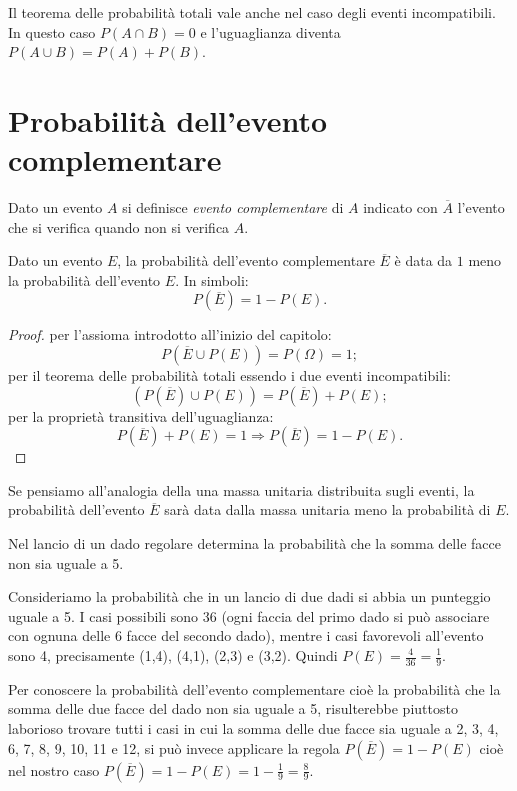 \osservazione Il teorema delle probabilità totali vale anche nel caso degli 
eventi incompatibili. In questo caso $P(A\cap B)=0$ e l'uguaglianza diventa $P(A\cup B)=P(A)+P(B)$.


\section{Probabilità dell'evento complementare}
\label{sec:09_complementare}

Dato un evento $A$ si definisce \emph{evento complementare} di $A$ indicato con 
$\overline A$ l'evento che si verifica quando non si verifica $A$.
\begin{teorema}
Dato un evento $E$, la probabilità dell'evento complementare $\overline E$ è 
data da $1$ meno la probabilità dell'evento $E$. In simboli: \[ P(\overline 
E)=1-P(E). \]
\end{teorema}
\begin{proof} per l'assioma introdotto all'inizio del capitolo: \[ P(\overline 
E\cup P(E))=P(\Omega )=1; \]
per il teorema delle probabilità totali essendo i due eventi incompatibili: \[ 
(P(\overline E)\cup P(E))=P(\overline E)+P(E); \]
per la proprietà transitiva dell'uguaglianza: \[ P(\overline E)+P(E)=1 
\Rightarrow P(\overline E)=1-P(E). \]
\end{proof}

Se pensiamo all'analogia della una massa unitaria distribuita sugli eventi, la 
probabilità dell'evento $\overline E$ sarà data dalla massa unitaria meno la 
probabilità di $E$.

\begin{esempio}
Nel lancio di un dado regolare determina la probabilità che la somma delle 
facce 
non sia uguale a 5.

Consideriamo la probabilità che in un lancio di due dadi si abbia un punteggio 
uguale a 5. I casi possibili sono 36 (ogni faccia del primo dado si può 
associare con ognuna delle 6 facce del secondo dado), mentre i casi favorevoli 
all'evento sono 4, precisamente (1,4), (4,1), (2,3) e (3,2). Quindi $P(E)=\frac 
4{36}=\frac 1 9$.

Per conoscere la probabilità dell'evento complementare cioè la probabilità che 
la somma delle due facce del dado non sia uguale a 5, risulterebbe piuttosto 
laborioso trovare tutti i casi in cui la somma delle due facce sia uguale a 2, 
3, 4, 6, 7, 8, 9, 10, 11 e 12, si può invece applicare la regola $P(\overline 
E)=1-P(E)$ cioè nel nostro caso $P(\overline E)=1-P(E)=1-\frac 1 9=\frac 8 9$.
\end{esempio}

